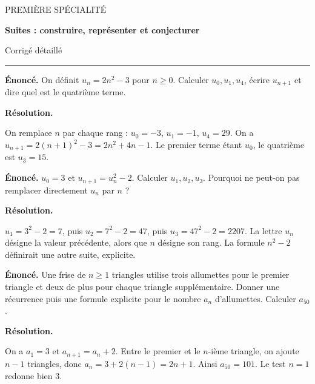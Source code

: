 \documentclass[11pt,a4paper]{article}
\begin{document}
{\small\color{Blue}PREMIÈRE SPÉCIALITÉ}\par{\LARGE\bfseries Suites : construire, représenter et conjecturer}\par{\large Corrigé détaillé}\par\vspace{0.2cm}\hrule\vspace{0.4cm}
\par\noindent\begin{minipage}{\linewidth}
{\small\color{Muted}\textbf{Énoncé.} On définit $u_n=2n^2-3$ pour $n\ge0$. Calculer $u_0,u_1,u_4$, écrire $u_{n+1}$ et dire quel est le quatrième terme.}
\par\medskip
\textbf{Résolution.}\par
On remplace $n$ par chaque rang : $u_0=-3$, $u_1=-1$, $u_4=29$. On a $u_{n+1}=2(n+1)^2-3=2n^2+4n-1$. Le premier terme étant $u_0$, le quatrième est $u_3=15$.
\end{minipage}\par
\par\noindent\begin{minipage}{\linewidth}
{\small\color{Muted}\textbf{Énoncé.} $u_0=3$ et $u_{n+1}=u_n^2-2$. Calculer $u_1,u_2,u_3$. Pourquoi ne peut-on pas remplacer directement $u_n$ par $n$ ?}
\par\medskip
\textbf{Résolution.}\par
$u_1=3^2-2=7$, puis $u_2=7^2-2=47$, puis $u_3=47^2-2=2207$. La lettre $u_n$ désigne la valeur précédente, alors que $n$ désigne son rang. La formule $n^2-2$ définirait une autre suite, explicite.
\end{minipage}\par
\par\noindent\begin{minipage}{\linewidth}
{\small\color{Muted}\textbf{Énoncé.} Une frise de $n\ge1$ triangles utilise trois allumettes pour le premier triangle et deux de plus pour chaque triangle supplémentaire. Donner une récurrence puis une formule explicite pour le nombre $a_n$ d’allumettes. Calculer $a_{50}$.}
\par\medskip
\textbf{Résolution.}\par
On a $a_1=3$ et $a_{n+1}=a_n+2$. Entre le premier et le $n$-ième triangle, on ajoute $n-1$ triangles, donc $a_n=3+2(n-1)=2n+1$. Ainsi $a_{50}=101$. Le test $n=1$ redonne bien $3$.
\end{minipage}\par
\end{document}
